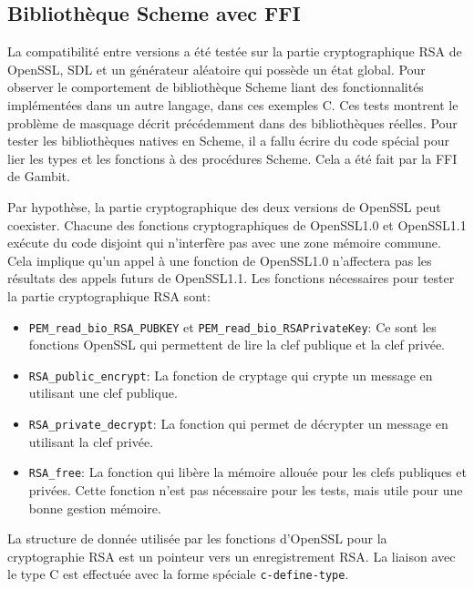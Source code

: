 

\clearpage
%
\subsection{Bibliothèque Scheme avec FFI}
%
La compatibilité entre versions a été testée sur la partie cryptographique RSA
de OpenSSL, SDL et un générateur aléatoire qui possède un état global.  Pour
observer le comportement de bibliothèque Scheme liant des fonctionnalités
implémentées dans un autre langage, dans ces exemples C. Ces tests montrent le
problème de masquage décrit précédemment dans des bibliothèques réelles.  Pour
tester les bibliothèques natives en Scheme, il a fallu écrire du code spécial
pour lier les types et les fonctions à des procédures Scheme. Cela a été fait
par la FFI de Gambit.

Par hypothèse, la partie cryptographique des deux versions de OpenSSL peut
coexister. Chacune des fonctions cryptographiques de OpenSSL1.0 et OpenSSL1.1
exécute du code disjoint qui n'interfère pas avec une zone mémoire commune.
Cela implique qu'un appel à une fonction de OpenSSL1.0 n'affectera pas les
résultats des appels futurs de OpenSSL1.1. Les fonctions nécessaires
pour tester la partie cryptographique RSA sont:
\begin{itemize}
    \item \lstinline{PEM_read_bio_RSA_PUBKEY} et \lstinline{PEM_read_bio_RSAPrivateKey}:
        Ce sont les fonctions OpenSSL qui permettent de lire la clef publique et la clef privée.
    \item \lstinline{RSA_public_encrypt}:
        La fonction de cryptage qui crypte un  message en utilisant une clef publique.
    \item \lstinline{RSA_private_decrypt}:
        La fonction qui permet de décrypter un message en utilisant la clef privée.
    \item \lstinline{RSA_free}:
        La fonction qui libère la mémoire allouée pour les clefs publiques et privées.
        Cette fonction n'est pas nécessaire pour les tests, mais utile pour une bonne
        gestion mémoire.
\end{itemize}
La structure de donnée utilisée par les fonctions d'OpenSSL pour la cryptographie RSA
est un pointeur vers un enregistrement RSA. La liaison avec le type C est effectuée avec
la forme spéciale \lstinline{c-define-type}.

